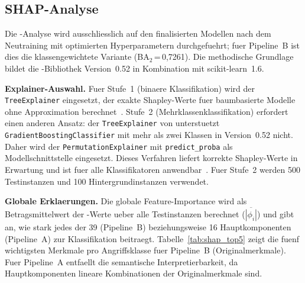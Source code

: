 \subsection{SHAP-Analyse}\label{shap_analyse}

Die \shap{}-Analyse wird ausschliesslich auf den finalisierten Modellen nach dem
Neutraining mit optimierten Hyperparametern durchgefuehrt; fuer Pipeline~B ist dies die
klassengewichtete Variante (BA$_2$\,=\,0{,}7261).
Die methodische Grundlage bildet die \shap{}-Bibliothek Version~0.52 in Kombination mit
scikit-learn~1.6.

\textbf{Explainer-Auswahl.}
Fuer Stufe~1 (binaere Klassifikation) wird der \texttt{TreeExplainer} eingesetzt, der exakte
Shapley-Werte fuer baumbasierte Modelle ohne Approximation berechnet~\cite{mohale2025xai}.
Stufe~2 (Mehrklassenklassifikation) erfordert einen anderen Ansatz: der
\texttt{TreeExplainer} von \shap{} unterstuetzt \texttt{GradientBoostingClassifier} mit
mehr als zwei Klassen in Version~0.52 nicht.
Daher wird der \texttt{PermutationExplainer} mit \texttt{predict\_proba} als
Modellschnittstelle eingesetzt.
Dieses Verfahren liefert korrekte Shapley-Werte in Erwartung und ist fuer alle
Klassifikatoren anwendbar~\cite{mohale2025xai}.
Fuer Stufe~2 werden 500 Testinstanzen und 100 Hintergrundinstanzen verwendet.

\textbf{Globale Erklaerungen.}
Die globale Feature-Importance wird als Betragsmittelwert der \shap{}-Werte ueber alle
Testinstanzen berechnet ($\overline{|\phi_i|}$) und gibt an, wie stark jedes der 39
(Pipeline~B) beziehungsweise 16 Hauptkomponenten (Pipeline~A) zur Klassifikation
beitraegt.
Tabelle~\ref{tab:shap_top5} zeigt die fuenf wichtigsten Merkmale pro Angriffsklasse fuer
Pipeline~B (Originalmerkmale).
Fuer Pipeline~A entfaellt die semantische Interpretierbarkeit, da Hauptkomponenten lineare
Kombinationen der Originalmerkmale sind.

